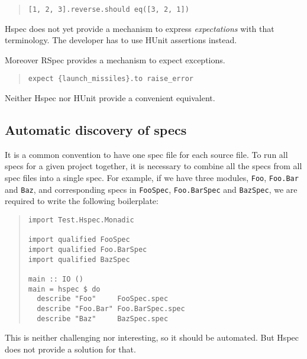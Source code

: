 \documentclass[preprint]{sigplanconf}
\begin{document}
\begin{quote}\small\begin{verbatim}
[1, 2, 3].reverse.should eq([3, 2, 1])
\end{verbatim}\end{quote}


\noindent Hspec does not yet provide a mechanism to express
\emph{expectations} with that terminology.  The developer has to use
HUnit assertions instead.

Moreover RSpec provides a mechanism to expect exceptions.

\begin{quote}\small\begin{verbatim}
expect {launch_missiles}.to raise_error
\end{verbatim}\end{quote}

\noindent Neither Hspec nor HUnit provide a convenient equivalent.

\subsection{Automatic discovery of specs}
\label{sec:problem-discovery}

It is a common convention to have one spec file for each source file.
To run all specs for a given project together, it is necessary to
combine all the specs from all spec files into a single spec.  For
example, if we have three modules, \verb|Foo|, \verb|Foo.Bar| and
\verb|Baz|, and corresponding specs in \verb|FooSpec|,
\verb|Foo.BarSpec| and \verb|BazSpec|, we are required to write the
following boilerplate:

\begin{quote}
\small
\begin{verbatim}
import Test.Hspec.Monadic

import qualified FooSpec
import qualified Foo.BarSpec
import qualified BazSpec

main :: IO ()
main = hspec $ do
  describe "Foo"     FooSpec.spec
  describe "Foo.Bar" Foo.BarSpec.spec
  describe "Baz"     BazSpec.spec
\end{verbatim}
\end{quote}

\noindent This is neither challenging nor interesting, so it should be
automated.  But Hspec does not provide a solution for that.
\end{document}
